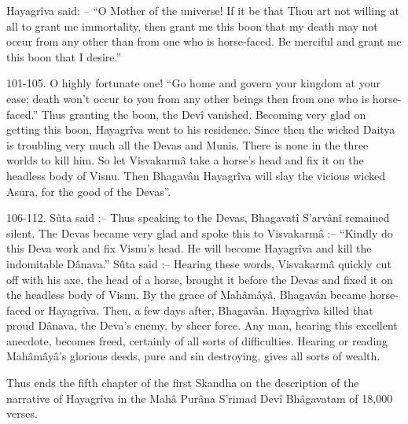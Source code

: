  

Hayagrîva said: -- “O Mother of the universe! If it be that Thou art not willing at all to grant me immortality, then grant me this boon that my death may not occur from any other than from one who is horse-faced. Be merciful and grant me this boon that I desire.”

 

101-105. O highly fortunate one! “Go home and govern your kingdom at your ease; death won't occur to you from any other beings then from one who is horse-faced.” Thus granting the boon, the Devî vanished. Becoming very glad on getting this boon, Hayagrîva went to his residence. Since then the wicked Daitya is troubling very much all the Devas and Munis. There is none in the three worlds to kill him. So let Visvakarmâ take a horse's head and fix it on the headless body of Visnu. Then Bhagavân Hayagrîva will slay the vicious wicked Asura, for the good of the Devas”.

 

106-112. Sûta said :-- Thus speaking to the Devas, Bhagavatî S’arvânî remained silent. The Devas became very glad and spoke this to Visvakarmâ :--  “Kindly do this Deva work and fix Visnu's head. He will become Hayagrîva and kill the indomitable Dânava.” Sûta said :-- Hearing these words, Visvakarmâ quickly cut off with his axe, the head of a horse, brought it before the Devas and fixed it on the headless body of Visnu. By the grace of Mahâmâyâ, Bhagavân became horse-faced or Hayagrîva. Then, a few days after, Bhagavân. Hayagrîva killed that proud Dânava, the Deva's enemy, by sheer force. Any man, hearing this excellent anecdote, becomes freed, certainly of all sorts of difficulties. Hearing or reading Mahâmâyâ's glorious deeds, pure and sin destroying, gives all sorts of wealth.

 

Thus ends the fifth chapter of the first Skandha on the description of the narrative of Hayagrîva in the Mahâ Purâna S’rimad Devî Bhâgavatam of 18,000 verses.